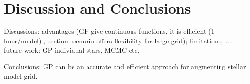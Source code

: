 \section{Discussion and Conclusions}\label{sec:conclusion}

Discussions: advantages (GP give continuous functions, it is efficient (1 hour/model) , section scenario offers flexibility for large grid); limitations, .... future work: GP individual stars, MCMC etc. 

Conclusions: GP can be an accurate and efficient approach for augmenting stellar model grid.   